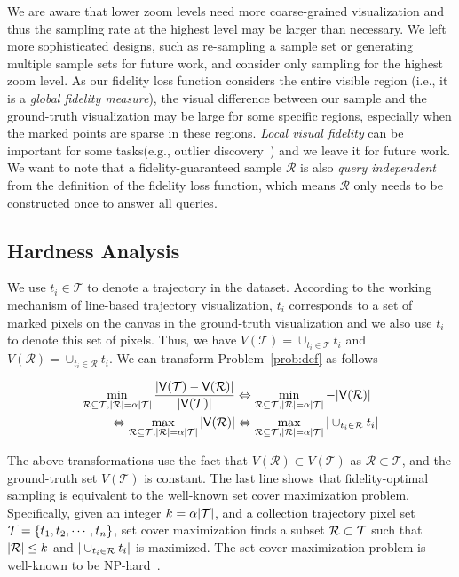 We are aware that lower zoom levels need more coarse-grained visualization and thus the sampling rate at the highest level may be larger than necessary. We left more sophisticated designs, such as re-sampling a sample set or generating multiple sample sets for future work, and consider only sampling for the highest zoom level. As our fidelity loss function considers the entire visible region (i.e., it is a \textit{global fidelity measure}), the visual difference between our sample and the ground-truth visualization may be large for some specific regions, especially when the marked points are sparse in these regions. \textit{Local visual fidelity} can be important for some tasks(e.g., outlier discovery~\cite{feng2010matching,mayorga2013splatterplots}) and we leave it for future work. We want to note that a fidelity-guaranteed sample $\mathcal{R}$ is also \textit{query independent} from the definition of the fidelity loss function, which means $\mathcal{R}$ only needs to be constructed once to answer all queries.

\subsection{Hardness Analysis}\label{sec:hard}
We use $t_i \in \mathcal{T}$ to denote a trajectory in the dataset. According to the working mechanism of line-based trajectory visualization, $t_i$ corresponds to a set of marked pixels on the canvas in the ground-truth visualization and we also use $t_i$ to denote this set of pixels. Thus, we have $V(\mathcal{T}) = \cup_{t_i \in \mathcal{T}} t_i$ and $V(\mathcal{R}) = \cup_{t_i \in \mathcal{R}} t_i$. We can transform Problem~\ref{prob:def} as follows

\begin{align}\label{eqn:obj2} \nonumber
\min_{\oR \subseteq \D, |\oR| = \alpha |\D|}  \frac{|\V(\D) - \V(\oR)|}{|\V(\D)|}  & \Leftrightarrow \min_{\oR \subseteq \D, |\oR| = \alpha |\D|}   - |\V(\oR)| \\ \nonumber
 \Leftrightarrow \max_{\oR \subseteq \D, |\oR| = \alpha |\D|}  |\V(\oR)| &  \Leftrightarrow \max_{\oR \subseteq \D, |\oR| = \alpha |\D|} | \cup_{t_i \in \oR} t_i |
\end{align}

The above transformations use the fact that $V(\mathcal{R}) \subset V(\mathcal{T})$ as $\mathcal{R} \subset \mathcal{T}$, and the ground-truth set $V(\mathcal{T})$ is constant. The last line shows that fidelity-optimal sampling is equivalent to the well-known set cover maximization problem.
Specifically, given an integer $k = \alpha |\mathcal{T}|$, and a collection trajectory pixel set $\mathcal{T} = \{t_1, t_2, \cdots, t_n \}$, set cover maximization finds a subset $\mathcal{R} \subset \mathcal{T}$ such that $|\mathcal{R}| \leq k$ and $|\cup_{t_i \in \mathcal{R}} t_i|$ is maximized. The set cover maximization problem is well-known to be NP-hard~\cite{setcover}.


